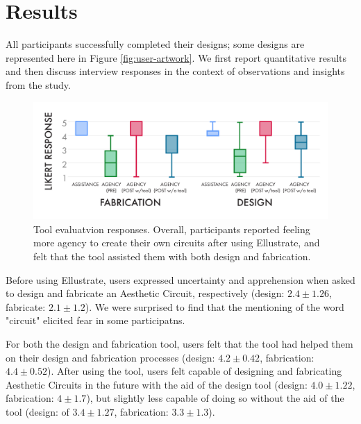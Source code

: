 \documentclass{sigchi}
\begin{document}
\section{Results}
All participants successfully completed their designs; some designs are represented here in Figure \ref{fig:user-artwork}. 
We first report quantitative results and then discuss interview responses in the context of observations and insights from the study.

\begin{figure}[t]
\centering
\includegraphics[width=1.0\columnwidth]{charts/boxplots_quant.pdf}
\caption{Tool evaluatvion responses. Overall, participants reported feeling more agency to create their own circuits after using Ellustrate, and felt that the tool assisted them with both design and fabrication.}
\label{fig:fab_tool_results}
\vspace{-20pt}
\end{figure}

Before using Ellustrate, users expressed uncertainty and apprehension when asked to design and fabricate an Aesthetic Circuit, respectively (design:  $2.4 \pm 1.26$, fabricate:  $2.1 \pm 1.2$). We were surprised to find that the mentioning of the word "circuit" elicited fear in some participatns. 

For both the design and fabrication tool, users felt that the tool had helped them on their design and fabrication processes (design:  $4.2 \pm 0.42$, fabrication:  $4.4 \pm 0.52$). After using the tool, users felt capable of designing and fabricating Aesthetic Circuits in the future with the aid of the design tool (design:  $4.0 \pm 1.22$, fabrication:  $4 \pm 1.7$), but slightly less capable of doing so without the aid of the tool (design:  of $3.4 \pm 1.27$, fabrication:  $3.3 \pm 1.3$). 
  
\end{document}
